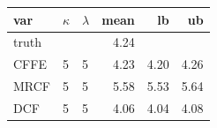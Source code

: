 \begin{tabular}{lllrrr}
  \hline
var & $\kappa$ & $\lambda$ & mean & lb & ub \\ 
  \hline
truth &  &  & 4.24 &  &  \\ 
  CFFE  & 5 & 5 & 4.23 & 4.20 & 4.26 \\ 
  MRCF  & 5 & 5 & 5.58 & 5.53 & 5.64 \\ 
  DCF  & 5 & 5 & 4.06 & 4.04 & 4.08 \\ 
   \hline
\end{tabular}
